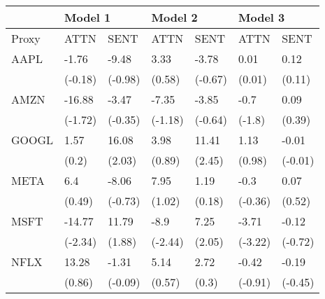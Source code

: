 \begin{tabular}{lllllll}
\toprule
{} & \multicolumn{2}{l}{Model 1} & \multicolumn{2}{l}{Model 2} & \multicolumn{2}{l}{Model 3} \\
\midrule
Proxy &     ATTN &     SENT &     ATTN &     SENT &     ATTN &     SENT \\
AAPL  &    -1.76 &    -9.48 &     3.33 &    -3.78 &     0.01 &     0.12 \\
      &  (-0.18) &  (-0.98) &   (0.58) &  (-0.67) &   (0.01) &   (0.11) \\
AMZN  &   -16.88 &    -3.47 &    -7.35 &    -3.85 &     -0.7 &     0.09 \\
      &  (-1.72) &  (-0.35) &  (-1.18) &  (-0.64) &   (-1.8) &   (0.39) \\
GOOGL &     1.57 &    16.08 &     3.98 &    11.41 &     1.13 &    -0.01 \\
      &    (0.2) &   (2.03) &   (0.89) &   (2.45) &   (0.98) &  (-0.01) \\
META  &      6.4 &    -8.06 &     7.95 &     1.19 &     -0.3 &     0.07 \\
      &   (0.49) &  (-0.73) &   (1.02) &   (0.18) &  (-0.36) &   (0.52) \\
MSFT  &   -14.77 &    11.79 &     -8.9 &     7.25 &    -3.71 &    -0.12 \\
      &  (-2.34) &   (1.88) &  (-2.44) &   (2.05) &  (-3.22) &  (-0.72) \\
NFLX  &    13.28 &    -1.31 &     5.14 &     2.72 &    -0.42 &    -0.19 \\
      &   (0.86) &  (-0.09) &   (0.57) &    (0.3) &  (-0.91) &  (-0.45) \\
\bottomrule
\end{tabular}
